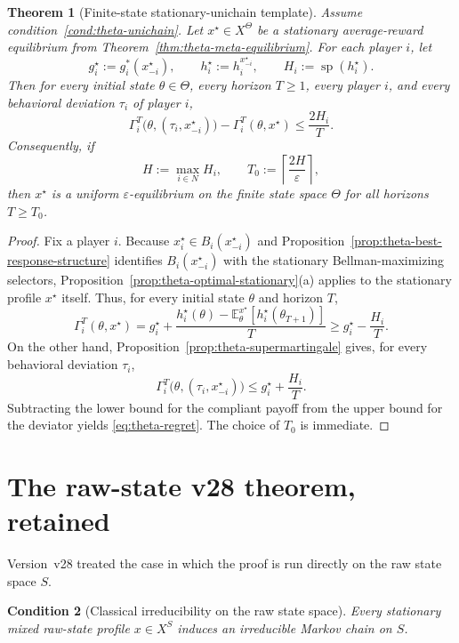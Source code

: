 \documentclass[11pt]{article}
\newtheorem{theorem}{Theorem}[section]
\newtheorem{condition}[theorem]{Condition}
\theoremstyle{definition}
\newcommand{\E}{\mathbb{E}}
\newcommand{\1}{\mathbf{1}}
\DeclareMathOperator{\spn}{sp}
\begin{document}
\begin{theorem}[Finite-state stationary-unichain template]\label{thm:theta-uniform}
Assume condition~\ref{cond:theta-unichain}. Let $x^\star\in X^\Theta$ be a stationary average-reward equilibrium from Theorem~\ref{thm:theta-meta-equilibrium}. For each player $i$, let
\[
g_i^\star:=g_i^*(x_{-i}^\star),
\qquad
h_i^\star:=h_i^{x_{-i}^\star},
\qquad
H_i:=\spn(h_i^\star).
\]
Then for every initial state $\theta\in\Theta$, every horizon $T\ge1$, every player $i$, and every behavioral deviation $\tau_i$ of player $i$,
\begin{equation}\label{eq:theta-regret}
\Gamma_i^T\bigl(\theta,(\tau_i,x_{-i}^\star)\bigr)-\Gamma_i^T(\theta,x^\star)
\le \frac{2H_i}{T}.
\end{equation}
Consequently, if
\[
H:=\max_{i\in N}H_i,
\qquad
T_0:=\left\lceil\frac{2H}{\varepsilon}\right\rceil,
\]
then $x^\star$ is a uniform $\varepsilon$-equilibrium on the finite state space $\Theta$ for all horizons $T\ge T_0$.
\end{theorem}

\begin{proof}
Fix a player $i$. Because $x_i^\star\in B_i(x_{-i}^\star)$ and Proposition~\ref{prop:theta-best-response-structure} identifies $B_i(x_{-i}^\star)$ with the stationary Bellman-maximizing selectors, Proposition~\ref{prop:theta-optimal-stationary}(a) applies to the stationary profile $x^\star$ itself. Thus, for every initial state $\theta$ and horizon $T$,
\[
\Gamma_i^T(\theta,x^\star)
= g_i^\star+\frac{h_i^\star(\theta)-\E_\theta^{x^\star}[h_i^\star(\theta_{T+1})]}{T}
\ge g_i^\star-\frac{H_i}{T}.
\]
On the other hand, Proposition~\ref{prop:theta-supermartingale} gives, for every behavioral deviation $\tau_i$,
\[
\Gamma_i^T\bigl(\theta,(\tau_i,x_{-i}^\star)\bigr)
\le g_i^\star+\frac{H_i}{T}.
\]
Subtracting the lower bound for the compliant payoff from the upper bound for the deviator yields \eqref{eq:theta-regret}. The choice of $T_0$ is immediate.
\end{proof}

\section{The raw-state v28 theorem, retained}\label{sec:raw-v28}

Version~v28 treated the case in which the proof is run directly on the raw state space $S$.

\begin{condition}[Classical irreducibility on the raw state space]\label{cond:raw-classical}
Every stationary mixed raw-state profile $x\in X^S$ induces an irreducible Markov chain on $S$.
\end{condition}
\end{document}
